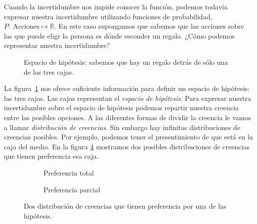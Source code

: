 \documentclass[a4paper,10pt]{book}
\theoremstyle{definition}
\begin{document}
Cuando la incertidumbre nos impide conocer la función, podemos todavía expresar nuestra incertidumbre utilizando funciones de probabilidad, $P : \ \text{Acciones} \mapsto \mathbb{R}$.
En este caso supongamos que sabemos que las acciones sobre las que puede eligr la persona es dónde esconder un regalo.
¿Cómo podemos representar nuestra incertidumbre?
\begin{figure}[ht!]     
 \centering
 \caption{Espacio de hipótesis: sabemos que hay un regalo detrás de sólo una de las tres cajas.}
 \label{fig:espacio_de_hipotesis}
\end{figure}
La figura~\ref{fig:espacio_de_hipotesis} nos ofrece suficiente información para definir un espacio de hipótesis: las tres cajas.
Las cajas representan el \emph{espacio de hipótesis}.
Para expresar nuestra incertidumbre sobre el espacio de hipótesis podemos repartir nuestra creencia entre las posibles opciones.
A las diferentes formas de dividir la creencia le vamos a llamar \emph{distribución de creencias}.
Sin embargo hay infinitas distribuciones de creencias posibles.
Por ejemplo, podemos tener el presentimiento de que está en la caja del medio.
En la figura \ref{fig:distribucion_de_creencias} mostramos dos posibles distribuciones de creencias que tienen preferencia esa caja.

\begin{figure}[ht!]     
 \centering
 \begin{subfigure}[b]{0.48\textwidth}
 \centering
    \caption{Preferencia total}
    \label{fig:preferencia_total}
 \end{subfigure}
 \begin{subfigure}[b]{0.48\textwidth}
 \centering
    \caption{Preferencia parcial}
    \label{fig:preferencia_parcial}
 \end{subfigure}
\caption{Dos distribución de creencias que tienen preferencia por una de las hipótesis.}
 \label{fig:distribucion_de_creencias}
\end{figure}
\end{document}

